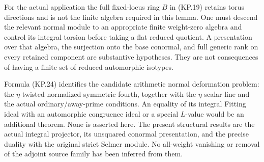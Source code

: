 For the actual application the full fixed-locus ring $B$
in (KP.19) retains torus directions and is not the finite
algebra required in this lemma.  One must descend the
relevant normal module to an appropriate finite
weight-zero algebra and control its integral torsion
before taking a flat reduced quotient.  A presentation
over that algebra, the surjection onto the base conormal,
and full generic rank on every retained component are
substantive hypotheses.  They are not consequences of
having a finite set of reduced automorphic isotypes.

Formula (KP.24) identifies the candidate arithmetic normal
deformation problem: the $\eta$-twisted normalized symmetric
fourth, together with the $\eta$ scalar line and the actual
ordinary/away-prime conditions.  An equality of its integral
Fitting ideal with an automorphic congruence ideal or a
special $L$-value would be an additional theorem.  None is
asserted here.  The present structural results are the
actual integral projector, its unsquared conormal presentation,
and the precise duality with the original strict Selmer
module.  No all-weight vanishing or removal of the adjoint
source family has been inferred from them.
